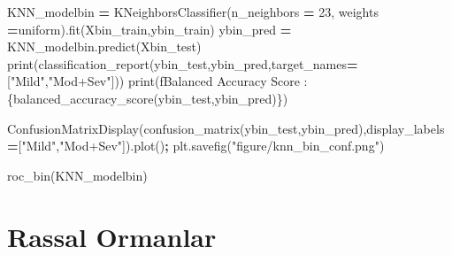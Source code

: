 \documentclass[12pt,twoside]{deuthesis}
\newenvironment{Shaded}{\begin{snugshade}}{\end{snugshade}}
\newcommand{\BuiltInTok}[1]{#1}
\newcommand{\DecValTok}[1]{\textcolor[rgb]{0.00,0.00,0.81}{#1}}
\newcommand{\NormalTok}[1]{#1}
\newcommand{\OperatorTok}[1]{\textcolor[rgb]{0.81,0.36,0.00}{\textbf{#1}}}
\newcommand{\SpecialCharTok}[1]{\textcolor[rgb]{0.00,0.00,0.00}{#1}}
\newcommand{\SpecialStringTok}[1]{\textcolor[rgb]{0.31,0.60,0.02}{#1}}
\newcommand{\StringTok}[1]{\textcolor[rgb]{0.31,0.60,0.02}{#1}}
\begin{document}
\begin{Shaded}
\begin{Highlighting}[]
\NormalTok{KNN\_modelbin }\OperatorTok{=}\NormalTok{ KNeighborsClassifier(n\_neighbors }\OperatorTok{=} \DecValTok{23}\NormalTok{,}
\NormalTok{                                 weights }\OperatorTok{=}\StringTok{\textquotesingle{}uniform\textquotesingle{}}\NormalTok{).fit(Xbin\_train,ybin\_train)}
\NormalTok{ybin\_pred }\OperatorTok{=}\NormalTok{ KNN\_modelbin.predict(Xbin\_test)}
\BuiltInTok{print}\NormalTok{(classification\_report(ybin\_test,ybin\_pred,target\_names}\OperatorTok{=}\NormalTok{[}\StringTok{"Mild"}\NormalTok{,}\StringTok{"Mod+Sev"}\NormalTok{]))}
\BuiltInTok{print}\NormalTok{(}\SpecialStringTok{f\textquotesingle{}Balanced Accuracy Score : }\SpecialCharTok{\{}\NormalTok{balanced\_accuracy\_score(ybin\_test,ybin\_pred)}\SpecialCharTok{\}}\SpecialStringTok{\textquotesingle{}}\NormalTok{)}
\end{Highlighting}
\end{Shaded}
\begin{Shaded}
\begin{Highlighting}[]
\NormalTok{ConfusionMatrixDisplay(confusion\_matrix(ybin\_test,ybin\_pred),display\_labels}\OperatorTok{=}\NormalTok{[}\StringTok{"Mild"}\NormalTok{,}\StringTok{"Mod+Sev"}\NormalTok{]).plot()}\OperatorTok{;}
\NormalTok{plt.savefig(}\StringTok{"figure/knn\_bin\_conf.png"}\NormalTok{)}
\end{Highlighting}
\end{Shaded}
\begin{Shaded}
\begin{Highlighting}[]
\NormalTok{roc\_bin(KNN\_modelbin)}
\end{Highlighting}
\end{Shaded}
\hypertarget{rassal-ormanlar-1}{%
\section{Rassal Ormanlar}\label{rassal-ormanlar-1}}
\end{document}
